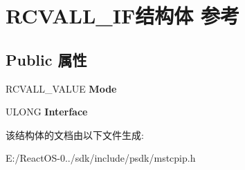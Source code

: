 \hypertarget{struct_r_c_v_a_l_l___i_f}{}\section{R\+C\+V\+A\+L\+L\+\_\+\+I\+F结构体 参考}
\label{struct_r_c_v_a_l_l___i_f}
\subsection*{Public 属性}
\begin{DoxyCompactItemize}
\item 
\mbox{\label{struct_r_c_v_a_l_l___i_f_a94ad70fc099249379a17bddab45fbabc}} 
R\+C\+V\+A\+L\+L\+\_\+\+V\+A\+L\+UE {\bfseries Mode}
\item 
\mbox{\label{struct_r_c_v_a_l_l___i_f_ad46ac413f9cd4eea2f9f2a6875105aea}} 
U\+L\+O\+NG {\bfseries Interface}
\end{DoxyCompactItemize}


该结构体的文档由以下文件生成\+:\begin{DoxyCompactItemize}
\item 
E\+:/\+React\+O\+S-\/0../sdk/include/psdk/mstcpip.\+h\end{DoxyCompactItemize}
